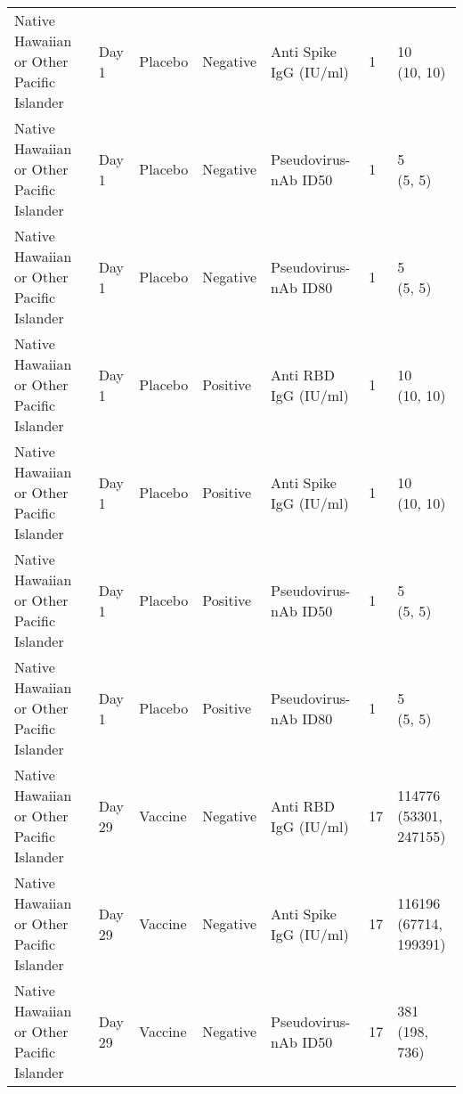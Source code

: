 \documentclass[]{book}
\theoremstyle{definition}
\theoremstyle{definition}
\theoremstyle{definition}
\newcommand{\1}{\mathbbm{1}}
\begin{document}
\begin{landscape}
\begin{ThreePartTable}
\begin{longtable}[t]{>{\raggedright\arraybackslash}p{7cm}llllll}
\hspace{1em}Native Hawaiian or Other Pacific Islander & Day 1 & Placebo & Negative & Anti Spike IgG (IU/ml) & 1 & \makecell[l]{10\\(10, 10)}\\
\hspace{1em}Native Hawaiian or Other Pacific Islander & Day 1 & Placebo & Negative & Pseudovirus-nAb ID50 & 1 & \makecell[l]{5\\(5, 5)}\\
\hspace{1em}Native Hawaiian or Other Pacific Islander & Day 1 & Placebo & Negative & Pseudovirus-nAb ID80 & 1 & \makecell[l]{5\\(5, 5)}\\
\hspace{1em}Native Hawaiian or Other Pacific Islander & Day 1 & Placebo & Positive & Anti RBD IgG (IU/ml) & 1 & \makecell[l]{10\\(10, 10)}\\
\hspace{1em}Native Hawaiian or Other Pacific Islander & Day 1 & Placebo & Positive & Anti Spike IgG (IU/ml) & 1 & \makecell[l]{10\\(10, 10)}\\
\hspace{1em}Native Hawaiian or Other Pacific Islander & Day 1 & Placebo & Positive & Pseudovirus-nAb ID50 & 1 & \makecell[l]{5\\(5, 5)}\\
\hspace{1em}Native Hawaiian or Other Pacific Islander & Day 1 & Placebo & Positive & Pseudovirus-nAb ID80 & 1 & \makecell[l]{5\\(5, 5)}\\
\hspace{1em}Native Hawaiian or Other Pacific Islander & Day 29 & Vaccine & Negative & Anti RBD IgG (IU/ml) & 17 & \makecell[l]{114776\\(53301, 247155)}\\
\hspace{1em}Native Hawaiian or Other Pacific Islander & Day 29 & Vaccine & Negative & Anti Spike IgG (IU/ml) & 17 & \makecell[l]{116196\\(67714, 199391)}\\
\hspace{1em}Native Hawaiian or Other Pacific Islander & Day 29 & Vaccine & Negative & Pseudovirus-nAb ID50 & 17 & \makecell[l]{381\\(198, 736)}\\

\end{longtable}
\end{ThreePartTable}
\end{landscape}
\end{document}
